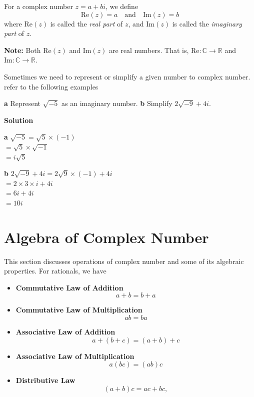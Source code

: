 \documentclass[
	12pt, %
	fleqn, %
	a4paper, %
]{LegrandOrangeBook}
\begin{document}
\begin{definition} 
    For a complex number \( z = a + bi \), we define
\[
\text{Re}(z) = a \quad \text{and} \quad \text{Im}(z) = b
\]
where \(\text{Re}(z)\) is called the \textit{real part} of \(z\), and \(\text{Im}(z)\) is called the \textit{imaginary part} of \(z\).

\textbf{Note:} Both \(\text{Re}(z)\) and \(\text{Im}(z)\) are real numbers. That is, \(\text{Re}: \mathbb{C} \rightarrow \mathbb{R}\) and \(\text{Im}: \mathbb{C} \rightarrow \mathbb{R}\).
\end{definition}    
Sometimes we need to represent or simplify a given number to complex number. refer to the following examples
\begin{example}
    \textbf{a} Represent \(\sqrt{-5}\) as an imaginary number. \quad
    \textbf{b} Simplify \(2\sqrt{-9} + 4i\).
\end{example}
\textbf{Solution}

\textbf{a} \(\sqrt{-5} = \sqrt{5} \times (-1)\) \\
 \(= \sqrt{5} \times \sqrt{-1}\) \\
 \(= i\sqrt{5}\)

\textbf{b} \(2\sqrt{-9} + 4i = 2\sqrt{9} \times (-1) + 4i\) \\
 \(= 2 \times 3 \times i + 4i\) \\
 \(= 6i + 4i\) \\
 \(= 10i\)
\section{Algebra of Complex Number} 
This section discusses operations of complex number and some of its algebraic properties.
For rationals, we have \begin{itemize}
    \item \textbf{Commutative Law of Addition}
    \[ a + b = b + a \]
    
    \item \textbf{Commutative Law of Multiplication}
    \[ ab = ba \]
    
    \item \textbf{Associative Law of Addition}
    \[ a + (b + c) = (a + b) + c \]
    
    \item \textbf{Associative Law of Multiplication}
    \[ a(bc) = (ab)c \]
    
    \item \textbf{Distributive Law}
    \[ (a + b)c = ac + bc, \]
\end{itemize}
\end{document}
